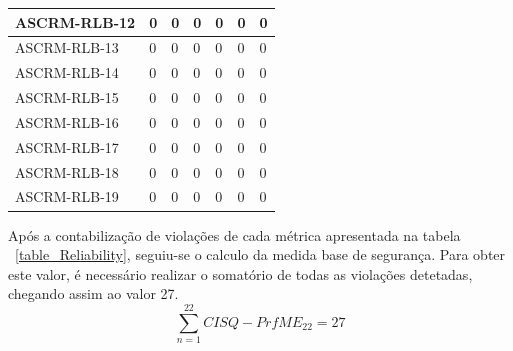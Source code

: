 \documentclass[openany,10pt,a4paper]{article}
\begin{document}
\begin{longtable}{|p{1.9in}|p{0.28in}|p{0.28in}|p{0.28in}|p{0.28in}|p{0.28in}|p{0.35in}|}
ASCRM-RLB-12 & 0 & 0 & 0 & 0 & 0 & 0 \\ \hline
ASCRM-RLB-13 & 0 & 0 & 0 & 0 & 0 & 0 \\ \hline
ASCRM-RLB-14 & 0 & 0 & 0 & 0 & 0 & 0 \\ \hline
ASCRM-RLB-15 & 0 & 0 & 0 & 0 & 0 & 0 \\ \hline
ASCRM-RLB-16 & 0 & 0 & 0 & 0 & 0 & 0 \\ \hline
ASCRM-RLB-17 & 0 & 0 & 0 & 0 & 0 & 0 \\ \hline
ASCRM-RLB-18 & 0 & 0 & 0 & 0 & 0 & 0 \\ \hline
ASCRM-RLB-19 & 0 & 0 & 0 & 0 & 0 & 0 \\ \hline
\end{longtable} 
Após a contabilização de violações de cada métrica apresentada na tabela ~\ref{table_Reliability}, seguiu-se o calculo da medida base de segurança. Para obter este valor, é necessário realizar o somatório de todas as violações detetadas, chegando assim ao valor 27.
$$\sum_{n=1}^{22} CISQ - PrfME_{22} = 27$$
\end{document}
